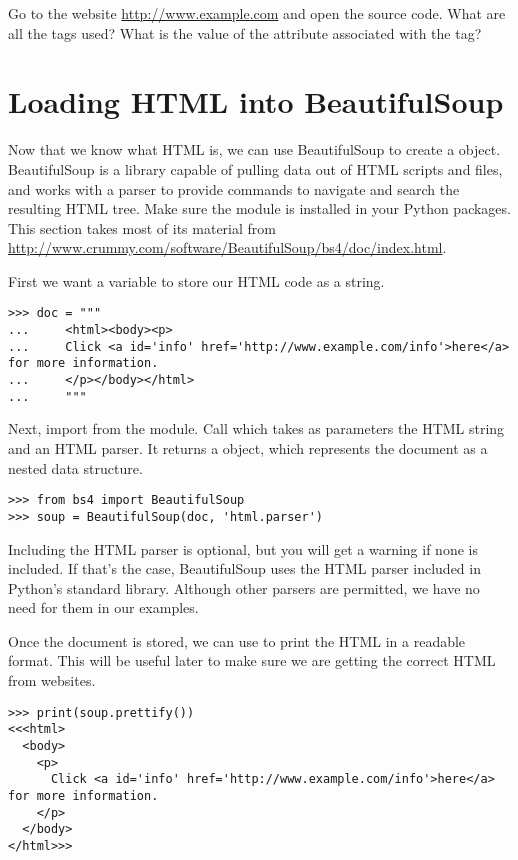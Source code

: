\begin{problem}
Go to the website \url{http://www.example.com} and open the source code.
What are all the tags used?
What is the value of the  attribute associated with the  tag?
\end{problem}

\section*{Loading HTML into BeautifulSoup}
Now that we know what HTML is, we can use BeautifulSoup to create a  object.
BeautifulSoup is a library capable of pulling data out of HTML scripts and files, and works with a parser to provide commands to navigate and search the resulting HTML tree.
Make sure the module  is installed in your Python packages.
This section takes most of its material from \url{http://www.crummy.com/software/BeautifulSoup/bs4/doc/index.html}.

First we want a variable to store our HTML code as a string.
\begin{lstlisting}
>>> doc = """
...     <html><body><p>
...     Click <a id='info' href='http://www.example.com/info'>here</a> for more information.
...     </p></body></html>
...     """
\end{lstlisting}

Next, import  from the  module.
Call  which takes as parameters the HTML string and an HTML parser. 
It returns a  object, which represents the document as a nested data structure.
\begin{lstlisting}
>>> from bs4 import BeautifulSoup
>>> soup = BeautifulSoup(doc, 'html.parser')
\end{lstlisting}

Including the HTML parser is optional, but you will get a warning if none is included.
If that's the case, BeautifulSoup uses the HTML parser included in Python's standard library.
Although other parsers are permitted, we have no need for them in our examples.

Once the document is stored, we can use  to print the HTML in a readable format.
This will be useful later to make sure we are getting the correct HTML from websites.

\begin{lstlisting}
>>> print(soup.prettify())
<<<html>
  <body>
    <p>
      Click <a id='info' href='http://www.example.com/info'>here</a> for more information.
    </p>
  </body>
</html>>>
\end{lstlisting}

